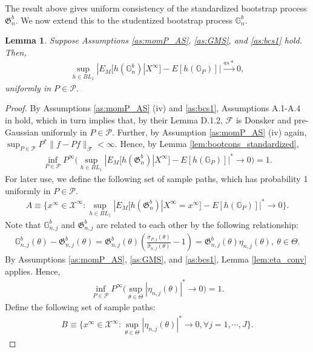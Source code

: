 \documentclass[letterpaper,11pt]{article}
\theoremstyle{myplain}
\newtheorem{lemma}{Lemma}[section]
\theoremstyle{mydefinition}
\theoremstyle{myremark}
\renewcommand{\cite}{\citet}
\numberwithin{equation}{section}
\numberwithin{figure}{section}
\begin{document}
\begin{appendices}
The result above gives uniform consistency of the standardized bootstrap process $\mathfrak G^b_{n}$. We now extend this to the studentized bootstrap process $\mathbb G^b_{n}$. 
\begin{lemma}\label{lem:boot_cons}
Suppose Assumptions \ref{as:momP_AS}, \ref{as:GMS}, and \ref{as:bcs1} hold. Then,
\begin{align}
\sup_{h\in BL_1}|E_M[h(\mathbb G^b_{n})|X^\infty]-E[h(\mathbb G_{P})]|\stackrel{as*}{\to}0,	
\end{align} 
uniformly in $P\in\mathcal P$.
\end{lemma}

\begin{proof}
By Assumptions \ref{as:momP_AS} (iv) and \ref{as:bcs1}, Assumptions A.1-A.4 in \cite{BCS14_misp} hold, which in turn implies that, by their Lemma D.1.2, $\mathcal F$ is Donsker and pre-Gaussian uniformly in $P\in\mathcal P$. Further, by Assumption \ref{as:momP_AS} (iv) again, $\sup_{P\in\mathcal P}P^*\|f-Pf\|_{\mathcal F}<\infty$. Hence, by Lemma \ref{lem:bootcons_standardized},
\begin{align}
	\inf_{P\in\mathcal P}P^\infty\Big(\sup_{h\in BL_1}|E_M[h(\mathfrak G^b_{n})|X^\infty]-E[h(\mathbb G_{P})]|^*\to 0\Big)=1.\label{eq:bootcon1}
\end{align}
For later use, we define the following set of sample paths, which has probability 1 uniformly in $P\in\mathcal P$.
\begin{align}
	A\equiv \Big\{x^\infty\in\mathcal X^\infty:\sup_{h\in BL_1}|E_M[h(\mathfrak G^b_{n})|X^\infty=x^\infty]-E[h(\mathbb G_P)]|^*\to 0\Big\}.
\end{align}
Note that $\mathbb G^b_{n,j}$ and $\mathfrak G^b_{n,j}$  are related to each other by the following relationship:
\begin{align}
	\mathbb G^b_{n,j}(\theta)-\mathfrak G^b_{n,j}(\theta)=\mathfrak G^b_{n,j}(\theta)\left(\frac{\sigma_{P,j}(\theta)}{\hat\sigma_{n,j}(\theta)}-1\right)=\mathfrak G^b_{n,j}(\theta)\eta_{n,j}(\theta),~\theta\in\Theta.\label{eq:Gdiff}
\end{align}
By Assumptions \ref{as:momP_AS}, \ref{as:GMS}, and \ref{as:bcs1}, Lemma \ref{lem:eta_conv} applies. Hence,
\begin{align}
	\inf_{P\in\mathcal P}P^\infty\Big(\sup_{\theta\in\Theta}|\eta_{n,j}(\theta)|^*\to 0\Big)=1.\label{eq:etaconv_inboot}
\end{align}
Define the following set of sample paths:
\begin{align}
	B\equiv\Big\{x^\infty\in\mathcal X^\infty:\sup_{\theta\in\Theta}|\eta_{n,j}(\theta)|^*\to 0,\forall j=1,\cdots,J\Big\}.

\end{align}
\end{proof}
\end{appendices}
\end{document}
